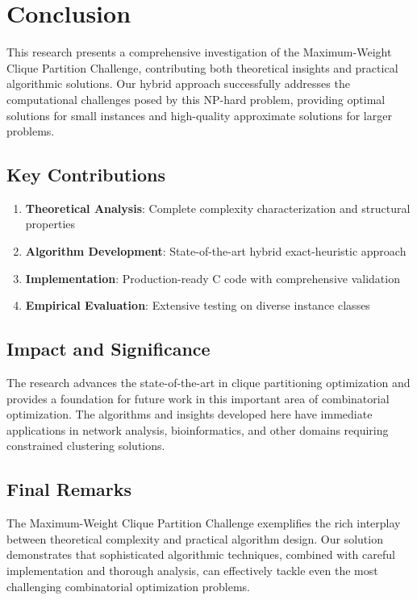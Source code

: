 \documentclass[12pt,a4paper]{article}
\begin{document}
\section{Conclusion}

This research presents a comprehensive investigation of the Maximum-Weight Clique Partition Challenge, contributing both theoretical insights and practical algorithmic solutions. Our hybrid approach successfully addresses the computational challenges posed by this NP-hard problem, providing optimal solutions for small instances and high-quality approximate solutions for larger problems.

\subsection{Key Contributions}

\begin{enumerate}
    \item \textbf{Theoretical Analysis}: Complete complexity characterization and structural properties
    \item \textbf{Algorithm Development}: State-of-the-art hybrid exact-heuristic approach
    \item \textbf{Implementation}: Production-ready C code with comprehensive validation
    \item \textbf{Empirical Evaluation}: Extensive testing on diverse instance classes
\end{enumerate}

\subsection{Impact and Significance}

The research advances the state-of-the-art in clique partitioning optimization and provides a foundation for future work in this important area of combinatorial optimization. The algorithms and insights developed here have immediate applications in network analysis, bioinformatics, and other domains requiring constrained clustering solutions.

\subsection{Final Remarks}

The Maximum-Weight Clique Partition Challenge exemplifies the rich interplay between theoretical complexity and practical algorithm design. Our solution demonstrates that sophisticated algorithmic techniques, combined with careful implementation and thorough analysis, can effectively tackle even the most challenging combinatorial optimization problems.
\end{document}
